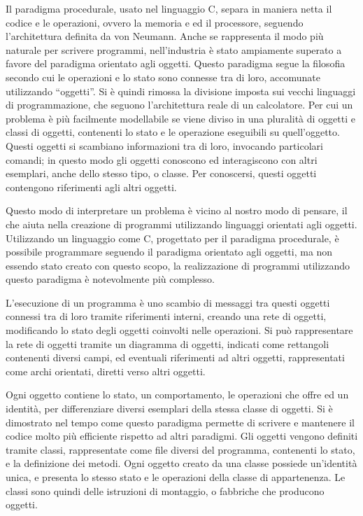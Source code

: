 \documentclass{article}
\numberwithin{equation}{subsection}
\begin{document}
Il paradigma procedurale, usato nel linguaggio C, separa in maniera netta il codice e le operazioni, ovvero la memoria e ed il processore, seguendo l'architettura 
definita da von Neumann. Anche se rappresenta il modo più naturale per scrivere programmi, nell'industria è stato ampiamente superato a favore del paradigma orientato agli 
oggetti. 
Questo paradigma segue la filosofia secondo cui le operazioni e lo stato sono connesse tra di loro, accomunate utilizzando ``oggetti''. Si è quindi rimossa la divisione imposta 
sui vecchi linguaggi di programmazione, che seguono l'architettura reale di un calcolatore. Per cui un problema è più facilmente modellabile se viene diviso in una pluralità 
di oggetti e classi di oggetti, contenenti lo stato e le operazione eseguibili su quell'oggetto. Questi oggetti si scambiano informazioni tra di loro, invocando particolari 
comandi; in questo modo gli oggetti conoscono ed interagiscono con altri esemplari, anche dello stesso tipo, o classe. Per conoscersi, questi oggetti contengono riferimenti 
agli altri oggetti. 

Questo modo di interpretare un problema è vicino al nostro modo di pensare, il che aiuta nella creazione di programmi utilizzando linguaggi orientati agli oggetti. 
Utilizzando un linguaggio come C, progettato per il paradigma procedurale, è possibile programmare seguendo il paradigma orientato agli oggetti, ma non essendo 
stato creato con questo scopo, la realizzazione di programmi utilizzando questo paradigma è notevolmente più complesso. 


L'esecuzione di un programma è uno scambio di messaggi tra questi oggetti connessi tra di loro tramite riferimenti interni, creando una rete di oggetti, modificando lo stato 
degli oggetti coinvolti nelle operazioni. Si può rappresentare la rete di oggetti tramite un diagramma di oggetti, indicati come rettangoli contenenti diversi campi, ed 
eventuali riferimenti ad altri oggetti, rappresentati come archi orientati, diretti verso altri oggetti.  

Ogni oggetto contiene lo stato, un comportamento, le operazioni che offre ed un identità, per differenziare diversi esemplari della stessa classe di oggetti. Si è dimostrato 
nel tempo come questo paradigma permette di scrivere e mantenere il codice molto più efficiente rispetto ad altri paradigmi. 
Gli oggetti vengono definiti tramite classi, rappresentate come file diversi del programma, contenenti lo stato, e la definizione dei metodi. Ogni oggetto creato da una classe 
possiede un'identità unica, e presenta lo stesso stato e le operazioni della classe di appartenenza. Le classi sono quindi delle istruzioni di montaggio, o fabbriche che 
producono oggetti. 
\end{document}
